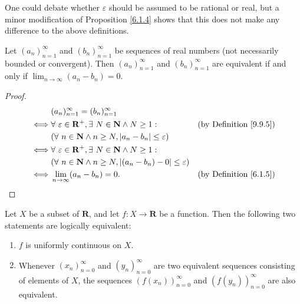 \begin{remark}\label{9.9.6}
    One could debate whether \(\varepsilon\) should be assumed to be rational or real, but a minor modification of Proposition \ref{6.1.4} shows that this does not make any difference to the above definitions.
\end{remark}

\begin{lemma}\label{9.9.7}
    Let \((a_n)_{n = 1}^\infty\) and \((b_n)_{n = 1}^\infty\) be sequences of real numbers
    (not necessarily bounded or convergent).
    Then \((a_n)_{n = 1}^\infty\) and \((b_n)_{n = 1}^\infty\) are equivalent if and only if \(\lim_{n \to \infty} (a_n - b_n) = 0\).
\end{lemma}

\begin{proof}
    \begin{align*}
             & (a_n)_{n = 1}^\infty = (b_n)_{n = 1}^\infty                                                                              \\
        \iff & \forall\ \varepsilon \in \mathbf{R}^+, \exists\ N \in \mathbf{N} \land N \geq 1 :   & \text{(by Definition \ref{9.9.5})} \\
             & (\forall\ n \in \mathbf{N} \land n \geq N, \abs*{a_n - b_n} \leq \varepsilon)                                            \\
        \iff & \forall\ \varepsilon \in \mathbf{R}^+, \exists\ N \in \mathbf{N} \land N \geq 1 :                                        \\
             & (\forall\ n \in \mathbf{N} \land n \geq N, \abs*{(a_n - b_n) - 0} \leq \varepsilon)                                      \\
        \iff & \lim_{n \to \infty} (a_n - b_n) = 0.                                                & \text{(by Definition \ref{6.1.5})}
    \end{align*}
\end{proof}

\begin{proposition}\label{9.9.8}
    Let \(X\) be a subset of \(\mathbf{R}\), and let \(f : X \to \mathbf{R}\) be a function.
    Then the following two statements are logically equivalent:
    \begin{enumerate}
        \item \(f\) is uniformly continuous on \(X\).
        \item Whenever \((x_n)_{n = 0}^\infty\) and \((y_n)_{n = 0}^\infty\) are two equivalent sequences consisting of elements of \(X\), the sequences \((f(x_n))_{n = 0}^\infty\) and \((f(y_n))_{n = 0}^\infty\) are also equivalent.
    \end{enumerate}
\end{proposition}

